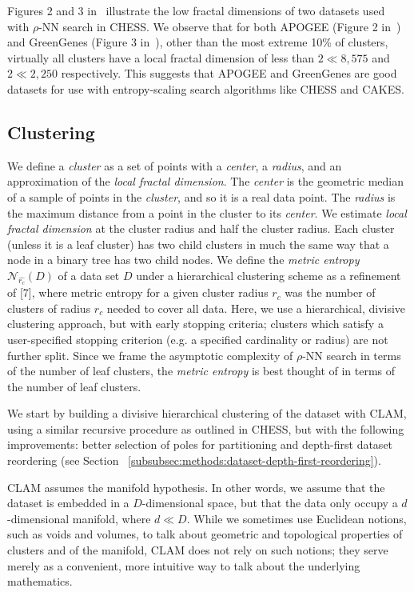 Figures 2 and 3 in~\cite{ishaq2019clustered} illustrate the low fractal dimensions of two datasets used with $\rho$-NN search in CHESS. 
We observe that for both APOGEE (Figure 2 in~\cite{ishaq2019clustered}) and GreenGenes (Figure 3 in~\cite{ishaq2019clustered}), other than the most extreme 10\% of clusters, virtually all clusters have a local fractal dimension of less than $2 \ll 8,575$
and $2 \ll 2,250$ respectively.
This suggests that APOGEE and GreenGenes are good datasets for use with entropy-scaling search algorithms like CHESS and CAKES.


\subsection{Clustering}
\label{subsec:methods:clustering}

We define a \emph{cluster} as a set of points with a \emph{center}, a \emph{radius}, and an approximation of the \emph{local fractal dimension}.
The \emph{center} is the geometric median of a sample of points in the \emph{cluster}, and so it is a real data point. The \emph{radius} is the
maximum distance from a point in the cluster to its \emph{center}. We estimate \emph{local fractal dimension} at the cluster radius and half
the cluster radius. Each cluster (unless it is a leaf cluster) has two child clusters in much the same way that a node in
a binary tree has two child nodes. We define the \emph{metric entropy} $\mathcal{N}_{\hat{r_c}}(D)$ of a data set $D$ under a hierarchical clustering scheme as a refinement of [7], where
metric entropy for a given cluster radius $r_c$ was the number of clusters of radius $r_c$ needed to cover all data. Here, we use a hierarchical, divisive clustering 
approach, but with early stopping criteria; clusters which satisfy a user-specified stopping criterion (e.g. a specified cardinality or radius) are not further split. 
Since we frame the asymptotic complexity of $\rho$-NN search in terms of the number of leaf clusters, the \emph{metric entropy} is best thought of in terms of the number of
leaf clusters. 


We start by building a divisive hierarchical clustering of the dataset with CLAM, using a 
similar recursive procedure as outlined in CHESS, but with the following 
improvements: better selection of poles for partitioning and depth-first dataset reordering 
(see Section ~\ref{subsubsec:methods:dataset-depth-first-reordering}). 


CLAM assumes the manifold hypothesis. 
In other words, we assume that the dataset is embedded in a $D$-dimensional space, but that the data only occupy 
a $d$-dimensional manifold, where $d \ll D$. 
While we sometimes use Euclidean notions, such as voids and volumes, to talk about geometric and topological 
properties of clusters and of the manifold, CLAM does not rely on such notions; 
they serve merely as a convenient, more intuitive way to talk about the underlying mathematics.

